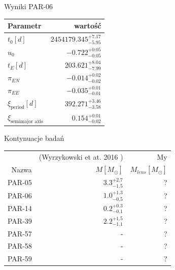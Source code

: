 \documentclass{beamer}
\begin{document}
\begin{frame}{Wyniki}
    \centering
    \large{PAR-06}
    \begin{tabularx}{\linewidth}{Xr}
        \toprule
        Parametr                      & wartość                         \\
        \midrule
        $t_0 [d]$                     & $2454179.345_{-5.95 } ^{+7.17}$ \\
        $u_0 $                        & $-0.722_{-0.05 } ^{+0.05}$      \\
        $t_E [d]$                     & $203.621_{-7.99 } ^{+8.04}$     \\
        $\pi_{EN}$                    & $-0.014_{-0.02 } ^{+0.02}$      \\
        $\pi_{EE}$                    & $-0.035_{-0.01 } ^{+0.01}$      \\
        $\xi_{\text{period}} [d]$     & $392.271_{-3.58 } ^{+3.46}$     \\
        $\xi_{\text{semimajor axis}}$ & $0.154_{-0.02 } ^{+0.01}$       \\
        \bottomrule
    \end{tabularx}
\end{frame}

\begin{frame}{Kontynuacje badań}
    \centering
    \begin{tabular}{rrr}
        \toprule
               & (Wyrzykowski et at. 2016 \cite{Basis_paper}) & My                     \\
        Nazwa  & $M [M_{\odot}]$                              & $M_{lens} [M_{\odot}]$ \\
        \midrule
        PAR-05 & $3.3^{+2.7}_{-1.5}$                          & ?                      \\
        PAR-06 & $1.0^{+1.3}_{-0.5}$                          & ?                      \\
        PAR-14 & $0.2^{+0.3}_{-0.1}$                          & ?                      \\
        PAR-39 & $2.2^{+1.5}_{-1.1}$                          & ?                      \\
        PAR-57 & -                                            & ?                      \\
        PAR-58 & -                                            & ?                      \\
        PAR-59 & -                                            & ?                      \\
        \bottomrule
    \end{tabular}

\end{frame}
\end{document}
